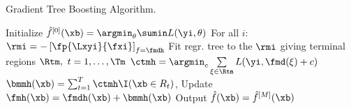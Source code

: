 \begin{algorithm}[H]
  \begin{footnotesize}
  \begin{center}
  \caption{Gradient Tree Boosting Algorithm.}
    \begin{algorithmic}[1]
      \State Initialize $\hat{f}^{[0]}(\xb) = \argmin_{\theta} \sumin L(\yi, \theta)$
          \State For all $i$: $\rmi = -\left[\fp{\Lxyi}{\fxi}\right]_{f=\fmdh}$
          \State Fit regr. tree to the $\rmi$ giving terminal regions $\Rtm,
          \ t = 1,\ldots,\Tm$
          \State $\ctmh = \argmin_{c} \sum \limits_{\xi \in \Rtm} L(\yi, \fmd(\xi) + c)$
        \EndFor
        \State $\bmmh(\xb) = \sum_{t=1}^{T} \ctmh \I(\xb \in R_t) $,
        \State Update $\fmh(\xb) = \fmdh(\xb) + \bmmh(\xb)$
      \EndFor
      \State Output $\hat{f}(\xb) = \hat{f}^{[M]}(\xb)$
    \end{algorithmic}
    \end{center}
    \end{footnotesize}
\end{algorithm}
